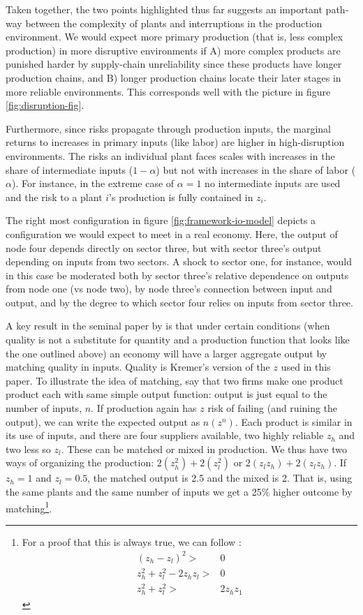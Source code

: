 \documentclass[11pt]{article}
\begin{document}
Taken together, the two points highlighted thus far suggests an important path-way between the complexity of plants and interruptions in the production environment.  We would expect more primary production (that is, less complex production) in more disruptive environments if A) more complex products are punished harder by supply-chain unreliability since these products have longer production chains, and B) longer production chains locate their later stages in more reliable environments. This corresponds well with the picture in figure \ref{fig:disruption-fig}. 

Furthermore, since risks propagate through production inputs, the marginal returns to increases in primary inputs (like labor) are higher in high-disruption environments. The risks an individual plant faces scales with increases in the share of intermediate inputs (\(1 - \alpha\)) but not with increases in the share of labor (\(\alpha\)). For instance, in the extreme case of \(\alpha = 1\) no intermediate inputs are used and the risk to a plant \(i\)'s production is fully contained in \(z_i\). 

The right most configuration in figure \ref{fig:framework-io-model} depicts a configuration we would expect to meet in a real economy. Here, the output of node four depends directly on sector three, but with sector three's output depending on inputs from two sectors. A shock to sector one, for instance, would in this case be moderated both by sector three's relative dependence on outputs from node one (vs node two), by node three's connection between input and output, and by the degree to which sector four relies on inputs from sector three.

A key result in the seminal paper by \cite{kremer_o-ring_1993} is that under certain conditions (when quality is not a substitute for quantity and a production function that looks like the one outlined above) an economy will have a larger aggregate output by matching quality in inputs. Quality is Kremer's version of the \(z\) used in this paper. To illustrate the idea of matching, say that two firms make one product product each with same simple output function: output is just equal to the number of inputs, $n$. If production again has $z$ risk of failing (and ruining the output), we can write the expected output as $n(z^n)$. Each product is similar in its use of inputs, and there are four suppliers available, two highly reliable \(z_{h}\) and two less so \(z_{l}\). These can be matched or mixed in production. We thus have two ways of organizing the production: $2(z_h^2) + 2(z_l^2)$ or $2(z_l z_h) + 2(z_l z_h)$. If $z_h = 1$ and $z_l = 0.5$, the matched output is 2.5 and the mixed is 2. That is, using the same plants and the same number of inputs we get a 25\% higher outcome by matching\footnote{For a proof that this is always true, we can follow \cite{kremer_o-ring_1993}:
\begin{align*}
	(z_h - z_l)^2 >& 0 \\  z_h^2 + z_l^2 - 2z_h z_l >& 0 \\ z_h^2 + z_l^2 >& 2z_h z_1
\end{align*}}.
\end{document}
